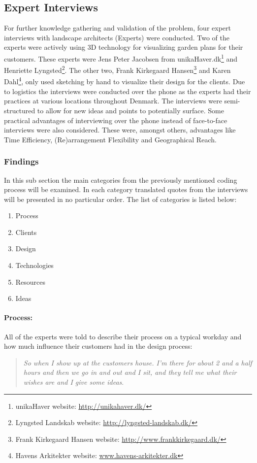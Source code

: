 	\subsection{Expert Interviews}\label{sec:expertInterviews}
	For further knowledge gathering and validation of the problem, four expert interviews with landscape architects (Experts) were conducted. Two of the experts were actively using 3D technology for visualizing garden plans for their customers. These experts were Jens Peter Jacobsen from unikaHaver.dk\footnote{unikaHaver website: \url{http://unikahaver.dk/}} and Henriette Lyngsted\footnote{Lyngsted Landskab website: \url{http://lyngsted-landskab.dk/}}. The other two, Frank Kirkegaard Hansen\footnote{Frank Kirkegaard Hansen website: \url{http://www.frankkirkegaard.dk/}} and Karen Dahl\footnote{Havens Arkitekter website: \url{www.havens-arkitekter.dk}}, only used sketching by hand to visualize their design for the clients. Due to logistics the interviews were conducted over the phone as the experts had their practices at various locations throughout Denmark. The interviews were semi-structured to allow for new ideas and points to potentially surface. Some practical advantages of interviewing over the phone instead of face-to-face interviews were also considered. These were, amongst others, advantages like Time Efficiency, (Re)arrangement Flexibility and Geographical Reach\cite{telephoneInterview}.
		
		\subsubsection{Findings}
		In this sub section the main categories from the previously mentioned coding process will be examined. In each category translated quotes from the interviews will be presented in no particular order. The list of categories is listed below:
		
		\begin{enumerate}
			\item Process
			\item Clients
			\item Design
			\item Technologies
			\item Resources
			\item Ideas
		\end{enumerate}
		
		\paragraph*{Process:}
		All of the experts were told to describe their process on a typical workday and how  much influence their customers had in the design process:\\
		\begin{quote}
			\textit{So when I show up at the customers house. I'm there for about 2 and a half hours and then we go in and out and I sit, and they tell me what their wishes are and I give some ideas}\label{quote:expertProcess1}.\\
		\end{quote}
		
